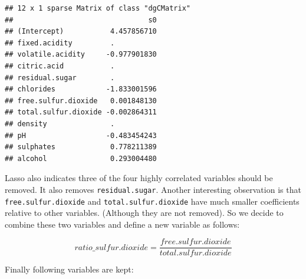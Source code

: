 \documentclass[../main.tex]{subfiles}
\begin{document}
\begin{Shaded}
\begin{Highlighting}[]
\StringTok{ }\OperatorTok{~}\StringTok{ }
\StringTok{ }\NormalTok{data.matrix[,}\OperatorTok{-}\NormalTok{]}
\StringTok{ }\OperatorTok{\$}
\NormalTok{(}\NormalTok{)}
\StringTok{ } \NormalTok{)}
\StringTok{ } \NormalTok{,}
                       \OperatorTok{\$}
\StringTok{ }
\end{Highlighting}
\end{Shaded}

\begin{verbatim}
## 12 x 1 sparse Matrix of class "dgCMatrix"
##                                s0
## (Intercept)           4.457856710
## fixed.acidity         .          
## volatile.acidity     -0.977901830
## citric.acid           .          
## residual.sugar        .          
## chlorides            -1.833001596
## free.sulfur.dioxide   0.001848130
## total.sulfur.dioxide -0.002864311
## density               .          
## pH                   -0.483454243
## sulphates             0.778211389
## alcohol               0.293004480
\end{verbatim}

\vspace{0.5cm}
\noindent Lasso also indicates three of the four highly correlated variables should be removed. It also removes \texttt{residual.sugar}. Another interesting observation is that \texttt{free.sulfur.dioxide} and \texttt{total.sulfur.dioxide} have much smaller coefficients relative to other variables. (Although they are not removed). So we decide to combine these two variables and define a new variable as follows:

$$ratio\_sulfur.dioxide=\frac{free.sulfur.dioxide}{total.sul
fur.dioxide}$$


Finally following variables are kept:
\end{document}
